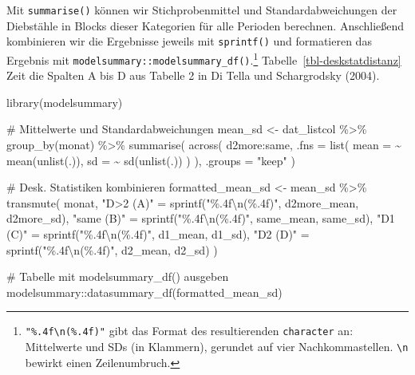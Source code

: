 \documentclass[
  a4paper,
  DIV=11,
  oneside]{scrreprt}
\newenvironment{Shaded}{\begin{snugshade}}{\end{snugshade}}
\newcommand{\AttributeTok}[1]{\textcolor[rgb]{0.40,0.45,0.13}{#1}}
\newcommand{\CommentTok}[1]{\textcolor[rgb]{0.37,0.37,0.37}{#1}}
\newcommand{\FunctionTok}[1]{\textcolor[rgb]{0.28,0.35,0.67}{#1}}
\newcommand{\NormalTok}[1]{\textcolor[rgb]{0.00,0.23,0.31}{#1}}
\newcommand{\OtherTok}[1]{\textcolor[rgb]{0.00,0.23,0.31}{#1}}
\newcommand{\SpecialCharTok}[1]{\textcolor[rgb]{0.37,0.37,0.37}{#1}}
\newcommand{\StringTok}[1]{\textcolor[rgb]{0.13,0.47,0.30}{#1}}
\begin{document}
Mit \texttt{summarise()} können wir Stichprobenmittel und
Standardabweichungen der Diebstähle in Blocks dieser Kategorien für alle
Perioden berechnen. Anschließend kombinieren wir die Ergebnisse jeweils
mit \texttt{sprintf()} und formatieren das Ergebnis mit
\texttt{modelsummary::modelsummary\_df()}.\footnote{\texttt{"\%.4f\textbackslash{}n(\%.4f)"}
  gibt das Format des resultierenden \texttt{character} an: Mittelwerte
  und SDs (in Klammern), gerundet auf vier Nachkommastellen.
  \texttt{\textbackslash{}n} bewirkt einen Zeilenumbruch.}
Tabelle~\ref{tbl-deskstatdistanz} Zeit die Spalten A bis D aus Tabelle 2
in Di Tella und Schargrodsky (2004).

\begin{Shaded}
\begin{Highlighting}[]
\FunctionTok{library}\NormalTok{(modelsummary)}

\CommentTok{\# Mittelwerte und Standardabweichungen}
\NormalTok{mean\_sd }\OtherTok{\textless{}{-}}\NormalTok{ dat\_listcol }\SpecialCharTok{\%\textgreater{}\%}
  \FunctionTok{group\_by}\NormalTok{(monat) }\SpecialCharTok{\%\textgreater{}\%}
  \FunctionTok{summarise}\NormalTok{(}
    \FunctionTok{across}\NormalTok{(}
\NormalTok{      d2more}\SpecialCharTok{:}\NormalTok{same,}
      \AttributeTok{.fns =} \FunctionTok{list}\NormalTok{(}
        \AttributeTok{mean =} \SpecialCharTok{\textasciitilde{}} \FunctionTok{mean}\NormalTok{(}\FunctionTok{unlist}\NormalTok{(.)), }
        \AttributeTok{sd =} \SpecialCharTok{\textasciitilde{}} \FunctionTok{sd}\NormalTok{(}\FunctionTok{unlist}\NormalTok{(.))}
\NormalTok{      )}
\NormalTok{    ),}
    \AttributeTok{.groups =} \StringTok{"keep"}
\NormalTok{  )}

\CommentTok{\# Desk. Statistiken kombinieren}
\NormalTok{formatted\_mean\_sd }\OtherTok{\textless{}{-}}\NormalTok{ mean\_sd }\SpecialCharTok{\%\textgreater{}\%}
  \FunctionTok{transmute}\NormalTok{(}
\NormalTok{    monat,}
    \StringTok{"D\textgreater{}2 (A)"} \OtherTok{=} \FunctionTok{sprintf}\NormalTok{(}\StringTok{"\%.4f}\SpecialCharTok{\textbackslash{}n}\StringTok{(\%.4f)"}\NormalTok{, d2more\_mean, d2more\_sd),}
    \StringTok{"same (B)"} \OtherTok{=} \FunctionTok{sprintf}\NormalTok{(}\StringTok{"\%.4f}\SpecialCharTok{\textbackslash{}n}\StringTok{(\%.4f)"}\NormalTok{, same\_mean, same\_sd),}
    \StringTok{"D1 (C)"} \OtherTok{=} \FunctionTok{sprintf}\NormalTok{(}\StringTok{"\%.4f}\SpecialCharTok{\textbackslash{}n}\StringTok{(\%.4f)"}\NormalTok{, d1\_mean, d1\_sd),}
    \StringTok{"D2 (D)"} \OtherTok{=} \FunctionTok{sprintf}\NormalTok{(}\StringTok{"\%.4f}\SpecialCharTok{\textbackslash{}n}\StringTok{(\%.4f)"}\NormalTok{, d2\_mean, d2\_sd)}
\NormalTok{  )}

\CommentTok{\# Tabelle mit modelsummary\_df() ausgeben}
\NormalTok{modelsummary}\SpecialCharTok{::}\FunctionTok{datasummary\_df}\NormalTok{(formatted\_mean\_sd)}
\end{Highlighting}
\end{Shaded}
\end{document}
